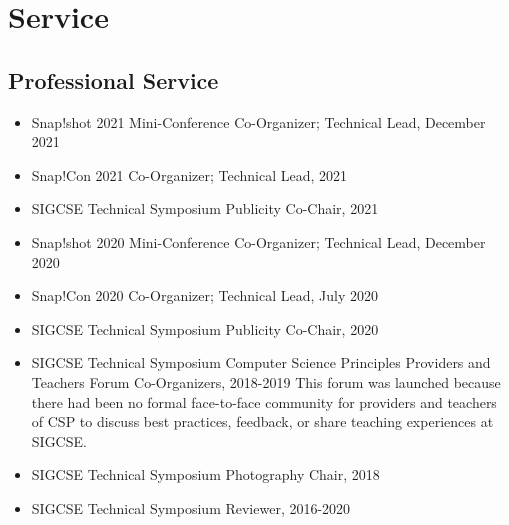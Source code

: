 \section{Service}

\vspace{6pt}

\subsection{Professional Service}

\vspace{5pt}

\begin{itemize}
 
  \setlength\itemsep{1em}
    
    \item{Snap!shot 2021 Mini-Conference Co-Organizer; Technical Lead, December 2021}
        
    \item{Snap!Con 2021 Co-Organizer; Technical Lead, 2021}
    
    \item{SIGCSE Technical Symposium Publicity Co-Chair, 2021}

    \item{Snap!shot 2020 Mini-Conference Co-Organizer; Technical Lead, December 2020}
        
    \item{Snap!Con 2020 Co-Organizer; Technical Lead, July 2020}
    
    \item{SIGCSE Technical Symposium Publicity Co-Chair, 2020}

    \item SIGCSE Technical Symposium Computer Science Principles Providers and Teachers Forum Co-Organizers, 2018-2019
    \newline
    \small This forum was launched because there had been no formal face-to-face community for providers and teachers of CSP to discuss best practices, feedback, or share teaching experiences at SIGCSE.
    
    \item{SIGCSE Technical Symposium Photography Chair, 2018}
    
    \item{SIGCSE Technical Symposium Reviewer, 2016-2020}
    
\end{itemize}

\vspace{10pt}

